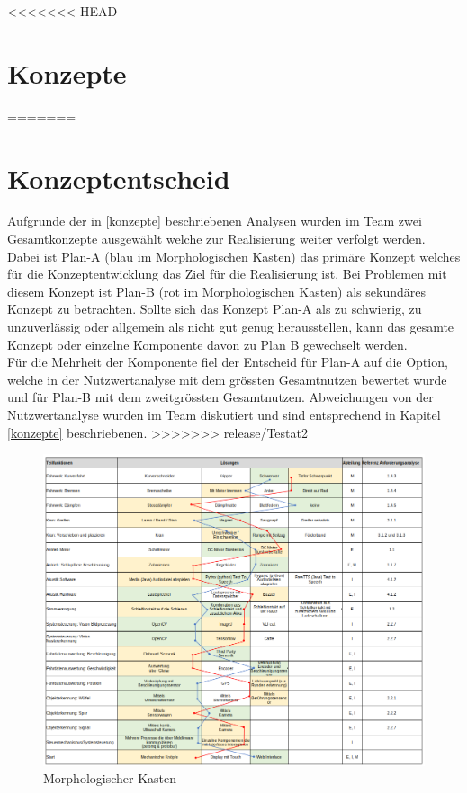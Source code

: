\documentclass[11pt]{scrartcl}
\begin{document}
<<<<<<< HEAD
        \section{Konzepte}
        
        
        \clearpage
=======
       


        \section{Konzeptentscheid}
        Aufgrunde der in \ref{konzepte} beschriebenen Analysen wurden im Team zwei Gesamtkonzepte ausgewählt welche zur Realisierung weiter verfolgt werden. Dabei ist Plan-A (blau im Morphologischen Kasten) das primäre Konzept welches für die Konzeptentwicklung das Ziel für die Realisierung ist. Bei Problemen mit diesem Konzept ist Plan-B (rot im Morphologischen Kasten) als sekundäres Konzept zu betrachten. Sollte sich das Konzept Plan-A als zu schwierig, zu unzuverlässig oder allgemein als nicht gut genug herausstellen, kann das gesamte Konzept oder einzelne Komponente davon zu Plan B gewechselt werden.\\
        Für die Mehrheit der Komponente fiel der Entscheid für Plan-A auf die Option, welche in der Nutzwertanalyse mit dem grössten Gesamtnutzen bewertet wurde und für Plan-B mit dem zweitgrössten Gesamtnutzen. Abweichungen von der Nutzwertanalyse wurden im Team diskutiert und sind entsprechend in Kapitel \ref{konzepte} beschriebenen. 
>>>>>>> release/Testat2

        \vspace{1.5cm}

        \begin{flushleft}
        \begin{figure}[H]
            \includegraphics[width=1\textwidth]{morphologischer_Kasten.png}
            \caption{Morphologischer Kasten}
            \label{fig:morph}
        \end{figure}
        \end{flushleft}
\end{document}
